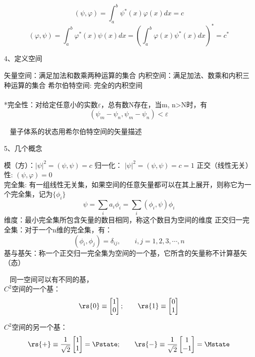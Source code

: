 \begin{frame} 
    \例 [2. 求定义在x空间的函数的内积]{}

    \解 ~ \[(\psi, \varphi)=\int_a ^b \psi^*(x)  \varphi(x) dx =c\]
    \[(\varphi,\psi)=\int_a ^b \varphi^*(x)\psi(x) dx = (\int_a ^b \varphi(x)\psi^*(x) dx) ^* =c^*\]
\end{frame} 

\begin{frame}
    4、定义空间\\
   \begin{itemize}
       \Item 矢量空间：满足加法和数乘两种运算的集合
       \Item 内积空间：满足加法、数乘和内积三种运算的集合
       \Item 希尔伯特空间:  完全的内积空间\\
       ~~ \\
       *完全性：对给定任意小的实数$\varepsilon$，总有数N存在，当m, n>N时，有\\
       $$ (\psi_m -\psi_n, \psi_m -\psi_n )< \varepsilon $$
   \end{itemize} 
   \Tips ~ 量子体系的状态用希尔伯特空间的矢量描述
\end{frame} 

\begin{frame}
    5、几个概念\\
   \begin{itemize}
       \Item 模（方）：$|\psi|^2= (\psi, \psi)=c$
       \Item 归一化： $|\psi|^2= (\psi, \psi)=c=1$
       \Item 正交（线性无关）性:  $(\psi, \varphi)=0 $ \\
       \Item 完全集: 有一组线性无关集，如果空间的任意矢量都可以在其上展开，则称它为一个完全集，记为$\{\phi_i\}$ 
       \[\psi=\sum_i a_i \phi_i= \sum_i (\phi_i,\psi) \phi_i\]
       \Item 维度：最小完全集所包含矢量的数目相同，称这个数目为空间的维度
       \Item 正交归一完全集：对于一个n维的完全集，有：\[(\phi_i,\phi_j)=\delta_{ij}, \qquad i,j=1,2,3,\cdots, n \]
       \Item 基与基矢：称一个正交归一完全集为空间的一个基，它所含的矢量称不计算基矢（态）
   \end{itemize} 
\end{frame} 

\begin{frame}
 \Tips~ 同一空间可以有不同的基，\\
 $C^2$空间的一个基：
 \[ \rs{0}\equiv\begin{bmatrix}
     1 \\
     0
 \end{bmatrix}; \qquad \rs{1}\equiv\begin{bmatrix}
    0 \\
    1
\end{bmatrix} \]

$C^2$空间的另一个基：
\[ \rs{+}\equiv\frac{1}{\sqrt{2}}\begin{bmatrix}
    1 \\
    1
\end{bmatrix}=\Pstate; \qquad \rs{-}\equiv\frac{1}{\sqrt{2}}\begin{bmatrix}
   1 \\
   -1
\end{bmatrix}=\Mstate \]

\end{frame} 

